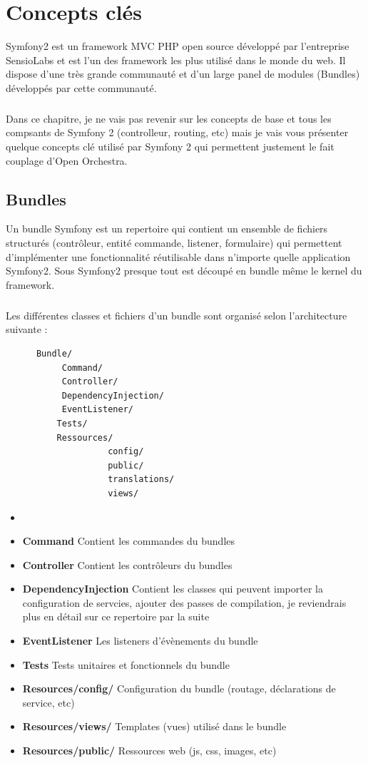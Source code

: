 \chapter{Concepts clés}
Symfony2 est un framework MVC PHP open source développé par l'entreprise SensioLabs et est l'un des framework les plus utilisé dans le monde du web. Il dispose d'une très grande communauté et d'un large panel de modules (\og{}Bundles\fg{}) développés par cette communauté.
\paragraph{}
Dans ce chapitre, je ne vais pas revenir sur les concepts de base et tous les compsants de Symfony 2 (controlleur, routing, etc) mais je vais vous présenter quelque concepts clé utilisé par Symfony 2 qui permettent justement le fait couplage d'Open Orchestra.
\section{Bundles}
\label{bundle}
Un bundle Symfony est un repertoire qui contient un ensemble de fichiers structurés (contrôleur, entité commande, listener, formulaire) qui permettent d'implémenter une fonctionnalité réutilisable dans n'importe quelle application Symfony2. Sous Symfony2 presque tout est découpé en bundle même le kernel du framework.
\paragraph{}
Les différentes classes et fichiers d'un bundle sont organisé selon l'architecture suivante : 

\begin{verbatim}
      Bundle/
           Command/  
           Controller/
           DependencyInjection/
           EventListener/
          Tests/
          Ressources/
                    config/
                    public/
                    translations/
                    views/
\end{verbatim}
\begin{itemize}
\item[]
\item \textbf{Command} Contient les commandes du bundles
\item \textbf{Controller} Contient les contrôleurs du bundles
\item \textbf{DependencyInjection} Contient les classes qui peuvent importer la configuration de servcies, ajouter des passes de compilation, je reviendrais plus en détail sur ce repertoire par la suite
\item \textbf{EventListener} Les listeners d'évènements du bundle
\item \textbf{Tests} Tests unitaires et fonctionnels du bundle
\item \textbf{Resources/config/} Configuration du bundle (routage, déclarations de service, etc)
\item \textbf{Resources/views/} Templates (vues) utilisé dans le bundle
\item \textbf{Resources/public/} Ressources web (js, css, images, etc)
\end{itemize}
